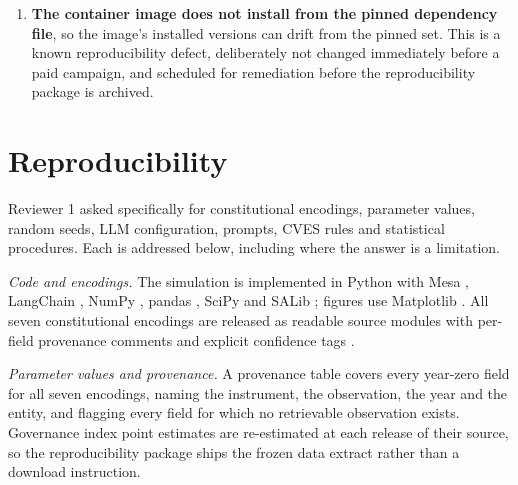\documentclass{ieeeaccess}
\newif\ifpendingvisible
\newcommand{\todo}[1]{%
  \ifpendingvisible\textcolor{red}{\textbf{[\MakeUppercase{#1}]}}\fi}
\begin{document}
\begin{enumerate}
to it and said so; where none did, the field is labelled an explicit
calibration anchor with its rationale. We specifically did not retrofit
a coincidental numerical match as a citation: a brute-force search over
roughly two thousand candidate transformations of a governance panel
hits any two-decimal target by chance, and hitting it is not provenance.
\item \textbf{The container image does not install from the pinned
dependency file}, so the image's installed versions can drift from the
pinned set. This is a known reproducibility defect, deliberately not
changed immediately before a paid campaign, and scheduled for
remediation before the reproducibility package is archived.
\todo{PENDING: confirm this is closed before submission, or keep it as a
stated limitation.}
\end{enumerate}

\section{Reproducibility}
\label{sec:repro}

Reviewer 1 asked specifically for constitutional encodings, parameter
values, random seeds, LLM configuration, prompts, CVES rules and
statistical procedures. Each is addressed below, including where the
answer is a limitation.

\emph{Code and encodings.} The simulation is implemented in Python with
Mesa \cite{kazil2020mesa}, LangChain \cite{chase2022langchain}, NumPy
\cite{harris2020array}, pandas \cite{mckinney2010data}, SciPy
\cite{virtanen2020scipy} and SALib \cite{herman2017salib}; figures use
Matplotlib \cite{hunter2007matplotlib}. All seven constitutional
encodings are released as readable source modules with per-field
provenance comments and explicit confidence tags
\cite{kanova2026repo}.

\emph{Parameter values and provenance.} A provenance table covers every
year-zero field for all seven encodings, naming the instrument, the
observation, the year and the entity, and flagging every field for which
no retrievable observation exists. Governance index point estimates are
re-estimated at each release of their source, so the reproducibility
package ships the frozen data extract rather than a download
instruction.
\end{document}
